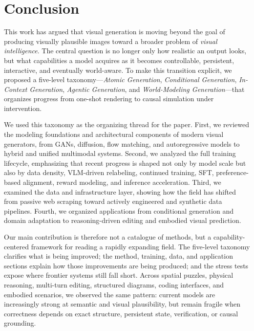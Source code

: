 \documentclass{llmxive}
\begin{document}
\section{Conclusion}\label{sec:conclusion}

This work has argued that visual generation is moving beyond the goal of producing visually plausible images toward a broader problem of \emph{visual intelligence}. The central question is no longer only how realistic an output looks, but what capabilities a model acquires as it becomes controllable, persistent, interactive, and eventually world-aware. To make this transition explicit, we proposed a five-level taxonomy---\emph{Atomic Generation}, \emph{Conditional Generation}, \emph{In-Context Generation}, \emph{Agentic Generation}, and \emph{World-Modeling Generation}---that organizes progress from one-shot rendering to causal simulation under intervention.

We used this taxonomy as the organizing thread for the paper. First, we reviewed the modeling foundations and architectural components of modern visual generators, from GANs, diffusion, flow matching, and autoregressive models to hybrid and unified multimodal systems. Second, we analyzed the full training lifecycle, emphasizing that recent progress is shaped not only by model scale but also by data density, VLM-driven relabeling, continued training, SFT, preference-based alignment, reward modeling, and inference acceleration. Third, we examined the data and infrastructure layer, showing how the field has shifted from passive web scraping toward actively engineered and synthetic data pipelines. Fourth, we organized applications from conditional generation and domain adaptation to reasoning-driven editing and embodied visual prediction.

Our main contribution is therefore not a catalogue of methods, but a capability-centered framework for reading a rapidly expanding field. The five-level taxonomy clarifies what is being improved; the method, training, data, and application sections explain how those improvements are being produced; and the stress tests expose where frontier systems still fall short. Across spatial puzzles, physical reasoning, multi-turn editing, structured diagrams, coding interfaces, and embodied scenarios, we observed the same pattern: current models are increasingly strong at semantic and visual plausibility, but remain fragile when correctness depends on exact structure, persistent state, verification, or causal grounding.
\end{document}
